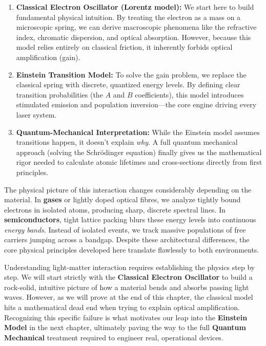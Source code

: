 \begin{enumerate}
    \item \textbf{Classical Electron Oscillator (Lorentz model):} We start here to build fundamental physical intuition. By treating the electron as a mass on a microscopic spring, we can derive macroscopic phenomena like the refractive index, chromatic dispersion, and optical absorption. However, because this model relies entirely on classical friction, it inherently forbids optical amplification (gain).
    \item \textbf{Einstein Transition Model:} To solve the gain problem, we replace the classical spring with discrete, quantized energy levels. By defining clear transition probabilities (the $A$ and $B$ coefficients), this model introduces stimulated emission and population inversion—the core engine driving every laser system.
    \item \textbf{Quantum-Mechanical Interpretation:} While the Einstein model assumes transitions happen, it doesn't explain \emph{why}. A full quantum mechanical approach (solving the Schrödinger equation) finally gives us the mathematical rigor needed to calculate atomic lifetimes and cross-sections directly from first principles.
\end{enumerate}

The physical picture of this interaction changes considerably depending on the material. In \textbf{gases} or lightly doped optical fibres, we analyze tightly bound electrons in isolated atoms, producing sharp, discrete spectral lines. In \textbf{semiconductors}, tight lattice packing blurs these energy levels into continuous \emph{energy bands}. Instead of isolated events, we track massive populations of free carriers jumping across a bandgap. Despite these architectural differences, the core physical principles developed here translate flawlessly to both environments.

\begin{motivation}
    Understanding light-matter interaction requires establishing the physics step by step. We will start strictly with the \textbf{Classical Electron Oscillator} to build a rock-solid, intuitive picture of how a material bends and absorbs passing light waves. However, as we will prove at the end of this chapter, the classical model hits a mathematical dead end when trying to explain optical amplification. Recognizing this specific failure is what motivates our leap into the \textbf{Einstein Model} in the next chapter, ultimately paving the way to the full \textbf{Quantum Mechanical} treatment required to engineer real, operational devices.
\end{motivation}

